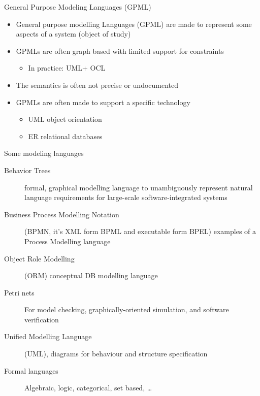 \documentclass[slidetop,mathserif,red]{beamer}
\begin{document}
\begin{frame}{General Purpose Modeling Languages (GPML)}

    \begin{itemize}
    \item General purpose modelling Languages (GPML) are made to represent some aspects of a system (object of study)

    \item GPMLs are often graph based with limited support for constraints
        \begin{itemize}
        \item In practice: UML+ OCL
        \end{itemize}
    \item The semantics is often not precise or undocumented
    \item GPMLs are often made to support a specific technology
        \begin{itemize}
        \item UML object orientation
        \item ER relational databases
        \end{itemize}
    \end{itemize}
\end{frame}


\begin{frame}{Some modeling languages}
        \begin{description}
        \item [Behavior Trees]  formal, graphical modelling language to unambiguously represent natural language requirements for large-scale software-integrated systems

        \item [Business Process Modelling Notation]  (BPMN, it's XML form BPML and executable form BPEL) examples of a Process Modelling language

        \item [Object Role Modelling] (ORM) conceptual DB modelling language

        \item [Petri nets] For model checking, graphically-oriented simulation, and software verification

        \item [Unified Modelling Language] (UML), diagrams for behaviour and structure specification

        \item[Formal languages] Algebraic, logic, categorical, set based, \ldots
        \end{description}
\end{frame}
\end{document}
